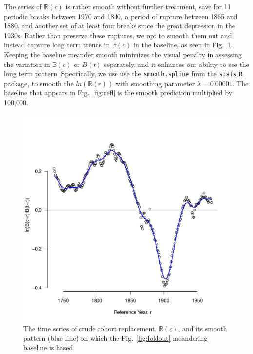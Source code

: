The series of $\mathbb{R}(c)$ is rather smooth without further treatment, save for 11 periodic breaks between 1970 and 1840, a period of rupture between 1865 and 1880, and another set of at least four breaks since the great depression in the 1930s. Rather than preserve these ruptures, we opt to smooth them out and instead capture long term trends in $\mathbb{R}(c)$ in the baseline, as seen in Fig.~\ref{fig:meander}. Keeping the baseline meander smooth minimizes the visual penalty in assessing the variation in $\mathbb{B}(c)$ or $B(t)$ separately, and it enhances our ability to see the long term pattern. Specifically, we use use the \texttt{smooth.spline} from the \texttt{stats} \texttt{R} package, to smooth the $ln(\mathbb{R}(r))$ with smoothing parameter $\lambda = 0.00001$. The baseline that appears in Fig.~\ref{fig:refl} is the smooth prediction multiplied by 100,000.

\begin{figure}[ht!]
\centering
\includegraphics[scale=.6]{Figures/Meander.pdf}
\caption{The time series of crude cohort replacement, $\mathbb{R}(c)$, and its smooth pattern (blue line) on which the Fig.~\ref{fig:foldout} meandering baseline is based.}
\label{fig:meander}
\end{figure}



